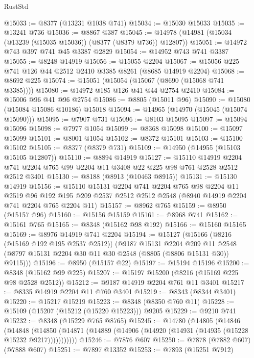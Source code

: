 \begin{lexlean}{RustStd}
\begin{coremodule}
@15033 := @8377 (@13231 @1038 @741)
@15034 := @15030 @15033
@15035 := @13241 @736
@15036 := @8867 @387
@15045 := @14978 (@14981 (@15034 (@13239 (@15035 @15036)) (@8377 (@8379 @736)) @12807))
@15051 := @14972 @743 @397 @741 @45 @3387 @2829
@15054 := @14952 @743 @741 @3387
@15055 := @8248 @14919
@15056 := @15055 @2204
@15067 := @15056 @225 @741 @126 @44 @2512 @2410 @3385 @8261 (@8685 @14919 @2204)
@15068 := @8692 @225
@15074 := @15051 (@15054 (@15067 (@8690 (@15068 @741 @3385))))
@15080 := @14972 @185 @126 @41 @44 @2754 @2410
@15084 := @15006 @96 @41 @96 @2754
@15086 := @8805 (@15011 @96)
@15090 := @15080 (@15084 @15086 @10186) @15018
@15094 := @14965 (@14970 (@15045 (@15074 @15090)))
@15095 := @7907 @731
@15096 := @8103 @15095
@15097 := @15094 @15096
@15098 := @7977 @1054
@15099 := @8368 @15098
@15100 := @15097 @15099
@15101 := @8001 @1054
@15102 := @8372 @15101
@15103 := @15100 @15102
@15105 := @8377 (@8379 @731)
@15109 := @14950 (@14955 (@15103 @15105 @12807))
@15110 := @8894 @14919
@15127 := @15110
    @14919
    @2204
    @741
    @2204
    @765
    @99
    @2204
    @11
    @3408
    @22
    @225
    @98
    @761
    @2528
    @2512
    @2512
    @3401
@15130 := @8188 (@8913 (@10463 @8915))
@15131 := @15130 @14919
@15156 := @15110
    @15131
    @2204
    @741
    @2204
    @765
    @98
    @2204
    @11
    @2519
    @96
    @192
    @195
    @209
    @2537
    @2512
    @2512
    @2548
    (@8940 @14919 @2204 @741 @2204 @765 @2204 @11)
@15157 := @8962 @765
@15159 := @8950 (@15157 @96)
@15160 := @15156 @15159
@15161 := @8968 @741
@15162 := @15161 @765
@15165 := @8348 (@15162 @98 @192)
@15166 := @15160 @15165
@15169 := @8976 @14919 @741 @2204
@15194 := @15127
    (@15166
      (@8216 (@15169 @192 @195 @2537 @2512))
      (@9187
        @15131
        @2204
        @209
        @11
        @2548
        (@8797 @15131 @2204 @30 @11 @30 @2548 (@8805 (@8806 @15131 @30)) @9115)))
@15196 := @8950 (@15157 @22)
@15197 := @15194 @15196
@15200 := @8348 (@15162 @99 @225)
@15207 := @15197 @15200 (@8216 (@15169 @225 @98 @2528 @2512))
@15212 := @9187 @14919 @2204 @761 @11 @3401
@15217 := @8335 @14919 @2204 @11 @760 @3401
@15219 := @8343 (@8344 @3401)
@15220 := @15217 @15219
@15223 := @8348 (@8350 @760 @11)
@15228 := @15109 (@15207 (@15212 (@15220 @15223))) @9205
@15229 := @9210 @741
@15232 := @8348 (@15229 @765 @8765)
@15245 := @14780
    (@14805
      (@14846
        (@14848
          (@14850 (@14871 (@14889 (@14906 (@14920 (@14931 (@14935 (@15228 @15232 @9217)))))))))))
@15246 := @7876 @607
@15250 := @7878 (@7882 @607) (@7888 @607)
@15251 := @7897 @13352
@15253 := @7893 (@15251 @7912)

\end{coremodule}
\end{lexlean}
